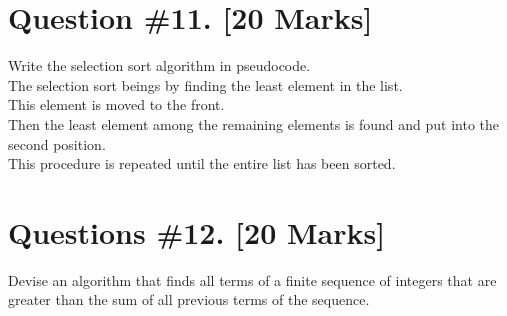 \documentclass{article}
\begin{document}
\section{Question \#11. [20 Marks]}
Write the selection sort algorithm in pseudocode. \\
The selection sort beings by finding the least element in the list. \\
This element is moved to the front. \\ 
Then the least element among the remaining elements is found and put into the second position. \\
This procedure is repeated until the entire list has been sorted. 
\newpage
\section{Questions \#12. [20 Marks]} 
Devise an algorithm that finds all terms of a finite sequence of integers that are greater than the sum of all previous terms of the sequence. 
\end{document}
